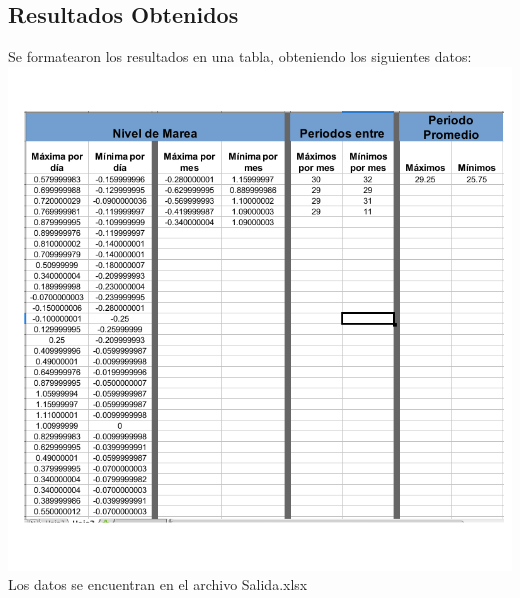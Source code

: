 \documentclass[letterpaper,10pt,twoside,onecolumn]{article}
\begin{document}
\subsection{Resultados Obtenidos}
Se formatearon los resultados en una tabla, obteniendo los siguientes datos:\\
\includegraphics[scale=.50]{SalidaFormato.png}\\
Los datos se encuentran en el archivo Salida.xlsx
\pagebreak
\end{document}
